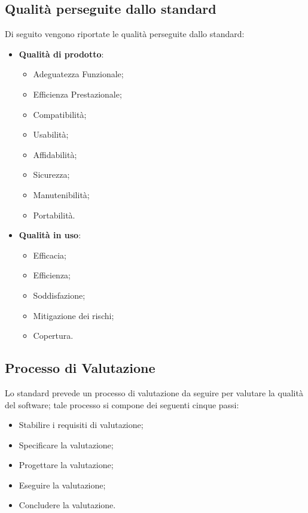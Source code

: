 \subsection{Qualità perseguite dallo standard}
Di seguito vengono riportate le qualità perseguite dallo standard:
\begin{itemize}
	\item \textbf{Qualità di prodotto}:
		\begin{itemize}
			\item Adeguatezza Funzionale;
			\item Efficienza Prestazionale;
			\item Compatibilità;
			\item Usabilità;
			\item Affidabilità;
			\item Sicurezza;
			\item Manutenibilità;
			\item Portabilità.
		\end{itemize}
	\item \textbf{Qualità in uso}:
		\begin{itemize}
			\item Efficacia;
			\item Efficienza;
			\item Soddisfazione;
			\item Mitigazione dei rischi;
			\item Copertura.
		\end{itemize}
\end{itemize}

\subsection{Processo di Valutazione}
Lo standard prevede un processo di valutazione da seguire per valutare la qualità del software; tale processo si compone dei seguenti cinque passi:
\begin{itemize}
	\item Stabilire i requisiti di valutazione;
	\item Specificare la valutazione;
	\item Progettare la valutazione;
	\item Eseguire la valutazione;
	\item Concludere la valutazione.
\end{itemize}